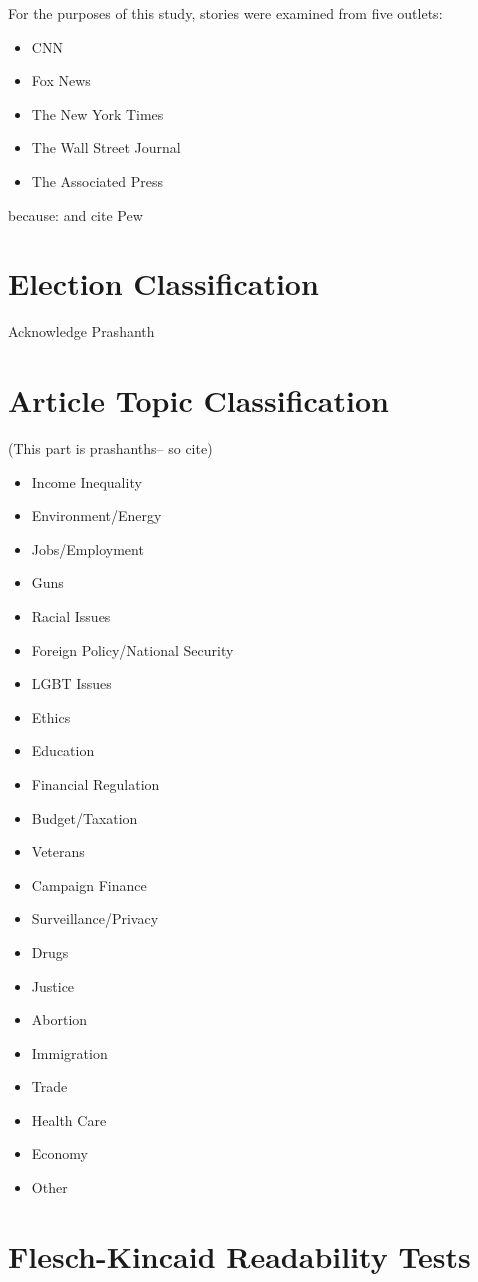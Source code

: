 For the purposes of this study, stories were examined from five outlets: 

\begin{itemize}
  \item CNN
  \item Fox News  
  \item The New York Times
  \item The Wall Street Journal
  \item The Associated Press 
\end{itemize}

because:   
and cite Pew

\section{Election Classification}

Acknowledge Prashanth

\section{Article Topic Classification}
(This part is prashanths-- so cite)
\begin{itemize}
  \item Income Inequality
  \item Environment/Energy
  \item Jobs/Employment
  \item Guns
  \item Racial Issues
  \item Foreign Policy/National Security
  \item LGBT Issues
  \item Ethics
  \item Education
  \item Financial Regulation
  \item Budget/Taxation
  \item Veterans
  \item Campaign Finance
  \item Surveillance/Privacy
  \item Drugs
  \item Justice
  \item Abortion
  \item Immigration
  \item Trade
  \item Health Care
  \item Economy
  \item Other 
\end{itemize}
 


\section{Flesch-Kincaid Readability Tests} 

















